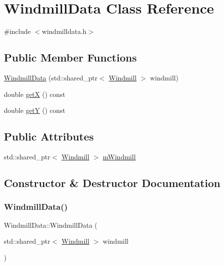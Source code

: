 \hypertarget{class_windmill_data}{}\section{Windmill\+Data Class Reference}
\label{class_windmill_data}


{\ttfamily \#include $<$windmilldata.\+h$>$}

\subsection*{Public Member Functions}
\begin{DoxyCompactItemize}
\item 
\mbox{\hyperlink{class_windmill_data_a80f7be41961c1c5be1a0b8fdfc24d8b7}{Windmill\+Data}} (std\+::shared\+\_\+ptr$<$ \mbox{\hyperlink{class_windmill}{Windmill}} $>$ windmill)
\item 
double \mbox{\hyperlink{class_windmill_data_a9cbd41017d829b127481600064a4d8a1}{getX}} () const
\item 
double \mbox{\hyperlink{class_windmill_data_a462411cd37254945bc59162f1a7505da}{getY}} () const
\end{DoxyCompactItemize}
\subsection*{Public Attributes}
\begin{DoxyCompactItemize}
\item 
std\+::shared\+\_\+ptr$<$ \mbox{\hyperlink{class_windmill}{Windmill}} $>$ \mbox{\hyperlink{class_windmill_data_a44143e28d15d0c574372c313ac9c693b}{m\+Windmill}}
\end{DoxyCompactItemize}


\subsection{Constructor \& Destructor Documentation}
\mbox{\label{class_windmill_data_a80f7be41961c1c5be1a0b8fdfc24d8b7}} 
\subsubsection{\texorpdfstring{WindmillData()}{WindmillData()}}
{\footnotesize\ttfamily Windmill\+Data\+::\+Windmill\+Data (\begin{DoxyParamCaption}\item[{std\+::shared\+\_\+ptr$<$ \mbox{\hyperlink{class_windmill}{Windmill}} $>$}]{windmill }\end{DoxyParamCaption})}



